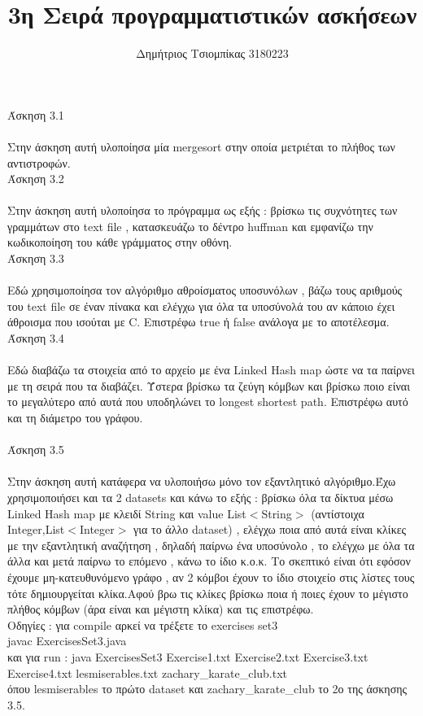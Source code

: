 \documentclass[12pt]{article}
\title{3η Σειρά προγραμματιστικών ασκήσεων}
\author{Δημήτριος Τσιομπίκας 3180223}
\begin{document}
\maketitle

Άσκηση 3.1\\ \\
Στην άσκηση αυτή υλοποίησα μία mergesort στην οποία μετριέται το πλήθος των αντιστροφών.\\

Άσκηση 3.2 \\ \\
Στην άσκηση αυτή υλοποίησα το πρόγραμμα ως εξής : βρίσκω τις συχνότητες των γραμμάτων στο text file , κατασκευάζω το δέντρο huffman και εμφανίζω την κωδικοποίηση του κάθε γράμματος στην οθόνη. \\

Άσκηση 3.3 \\ \\
Εδώ χρησιμοποίησα τον αλγόριθμο αθροίσματος υποσυνόλων , βάζω τους αριθμούς του text file σε έναν πίνακα και ελέγχω για όλα τα υποσύνολά του αν κάποιο έχει άθροισμα που ισούται με C. Επιστρέφω true ή false ανάλογα με το αποτέλεσμα. \\

Άσκηση 3.4 \\ \\
Εδώ διαβάζω τα στοιχεία από το αρχείο με ένα Linked Hash map ώστε να τα παίρνει με τη σειρά που τα διαβάζει. Ύστερα βρίσκω τα ζεύγη κόμβων και βρίσκω ποιο είναι το μεγαλύτερο από αυτά που υποδηλώνει το longest shortest path. Επιστρέφω αυτό και τη διάμετρο του γράφου. \\ \\

Άσκηση 3.5 \\ \\
Στην άσκηση αυτή κατάφερα να υλοποιήσω μόνο τον εξαντλητικό αλγόριθμο.Έχω χρησιμοποιήσει και τα 2 datasets και κάνω το εξής : βρίσκω όλα τα δίκτυα μέσω Linked Hash map με κλειδί String και value List$<$String$>$ (αντίστοιχα Integer,List$<$Integer$>$ για το άλλο dataset) , ελέγχω ποια από αυτά είναι κλίκες με την εξαντλητική αναζήτηση , δηλαδή παίρνω ένα υποσύνολο , το ελέγχω με όλα τα άλλα και μετά παίρνω το επόμενο , κάνω το ίδιο κ.ο.κ. Το σκεπτικό είναι ότι εφόσον έχουμε μη-κατευθυνόμενο γράφο , αν 2 κόμβοι έχουν το ίδιο στοιχείο στις λίστες τους τότε δημιουργείται κλίκα.Αφού βρω τις κλίκες βρίσκω ποια ή ποιες έχουν το μέγιστο πλήθος κόμβων (άρα είναι και μέγιστη κλίκα) και τις επιστρέφω. \\

Οδηγίες : για compile αρκεί να τρέξετε το exercises set3 \\
javac ExercisesSet3.java \\
και για run :  java ExercisesSet3 Exercise1.txt Exercise2.txt Exercise3.txt Exercise4.txt lesmiserables.txt  zachary\_karate\_club.txt \\
όπου lesmiserables το πρώτο dataset και zachary\_karate\_club το 2ο της άσκησης 3.5.
\end{document}
